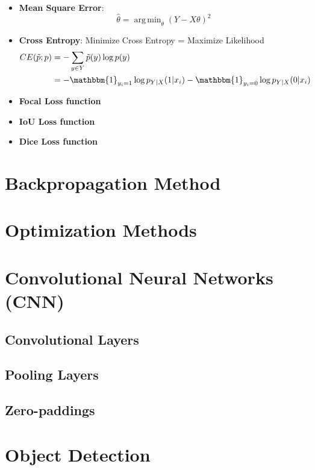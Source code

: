 \documentclass[a4paper]{article}
\DeclareMathOperator*{\argmin}{arg\,min}
\begin{document}
\begin{itemize}
	\item \textbf{Mean Square Error}:
	\begin{equation}
		\hat{\theta} = \argmin_{\theta} ( Y - X \theta )^2
	\end{equation}
	\item \textbf{Cross Entropy}: Minimize Cross Entropy = Maximize Likelihood
	\begin{align}
		CE(\tilde{p}; p) &= - \sum_{y \in Y} \tilde{p} (y) \log p(y) \\
		&= - \mathbbm{1}_{y_i = 1} \log p_{Y|X} (1 | x_i) - \mathbbm{1}_{y_i = 0} \log p_{Y|X} (0 | x_i)
	\end{align}
	\item \textbf{Focal Loss function}
	\item \textbf{IoU Loss function}
	\item \textbf{Dice Loss function}
\end{itemize}

\section{Backpropagation Method}

\section{Optimization Methods}

\section{Convolutional Neural Networks (CNN)}

\subsection{Convolutional Layers}

\subsection{Pooling Layers}

\subsection{Zero-paddings}

\section{Object Detection}
\end{document}
